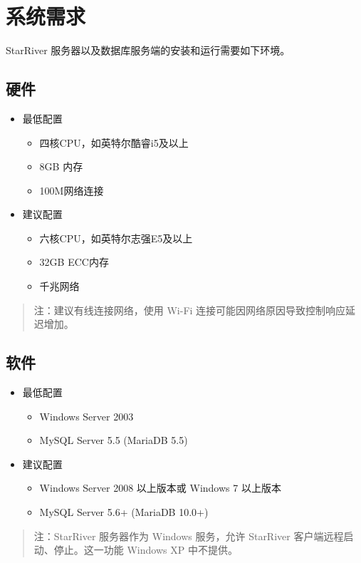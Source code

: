 \section{系统需求}\label{ux7cfbux7edfux9700ux6c42}

StarRiver 服务器以及数据库服务端的安装和运行需要如下环境。

\subsection{硬件}\label{ux786cux4ef6}

\begin{itemize}
\itemsep1pt\parskip0pt
\item
  最低配置

  \begin{itemize}
  \itemsep1pt\parskip0pt
  \item
    四核CPU，如英特尔酷睿i5及以上
  \item
    8GB 内存
  \item
    100M网络连接
  \end{itemize}
\item
  建议配置

  \begin{itemize}
  \itemsep1pt\parskip0pt
  \item
    六核CPU，如英特尔志强E5及以上
  \item
    32GB ECC内存
  \item
    千兆网络
  \end{itemize}
\end{itemize}

\begin{quote}
注：建议有线连接网络，使用 Wi-Fi
连接可能因网络原因导致控制响应延迟增加。
\end{quote}

\subsection{软件}\label{ux8f6fux4ef6}

\begin{itemize}
\itemsep1pt\parskip0pt
\item
  最低配置

  \begin{itemize}
  \itemsep1pt\parskip0pt
  \item
    Windows Server 2003
  \item
    MySQL Server 5.5 (MariaDB 5.5)
  \end{itemize}
\item
  建议配置

  \begin{itemize}
  \itemsep1pt\parskip0pt
  \item
    Windows Server 2008 以上版本或 Windows 7 以上版本
  \item
    MySQL Server 5.6+ (MariaDB 10.0+)
  \end{itemize}
\end{itemize}

\begin{quote}
注：StarRiver 服务器作为 Windows 服务，允许 StarRiver
客户端远程启动、停止。这一功能 Windows XP 中不提供。
\end{quote}
